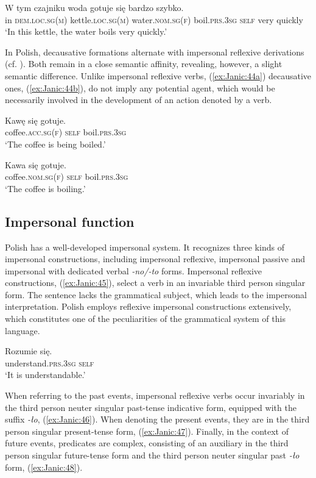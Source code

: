 \documentclass[output=paper]{langscibook}
\begin{document}
\ea \label{ex:Janic:43}
\gll W	tym		 czajniku	 woda	 gotuje	 się 	 bardzo	szybko.\\
 	in	\textsc{dem.loc.sg(m)}	kettle.\textsc{loc.sg(m)}	water.\textsc{nom.sg(f)}	boil.\textsc{prs.3sg}	\textsc{self}	very	quickly\\
\glt ‘In this kettle, the water boils very quickly.’	
\z 
	
In Polish, decausative formations alternate with impersonal reflexive derivations (cf. ). Both remain in a close semantic affinity, revealing, however, a slight semantic difference. Unlike impersonal reflexive verbs, (\ref{ex:Janic:44a}) decausative ones, (\ref{ex:Janic:44b}), do not imply any potential agent, which would be necessarily involved in the development of an action denoted by a verb.

\ea \label{ex:Janic:44}
\ea \label{ex:Janic:44a}
\gll Kawę				 się		 gotuje.\\
		coffee.\textsc{acc.sg(f)}	\textsc{self}	boil.\textsc{prs.3sg} \\	
\glt ‘The coffee is being boiled.’

\ex \label{ex:Janic:44b}
\gll Kawa		 się	 gotuje.\\
		coffee.\textsc{nom.sg(f)}		\textsc{self}	boil.\textsc{prs.3sg}\\
\glt ‘The coffee is boiling.' \citep[320]{Swan2002} 
\z 
\z 


\subsection{Impersonal function} \label{sec:Janic:4.2}

Polish has a well-developed impersonal system. It recognizes three kinds of impersonal constructions, including impersonal reflexive, impersonal passive and impersonal with dedicated verbal \textit{-no/-to} forms. Impersonal reflexive constructions, (\ref{ex:Janic:45}), select a verb in an invariable third person singular form. The sentence lacks the grammatical subject, which leads to the impersonal interpretation. Polish employs reflexive impersonal constructions extensively, which constitutes one of the peculiarities of the grammatical system of this language.

\ea \label{ex:Janic:45}
\gll Rozumie	 się.	\\
	 understand.\textsc{prs.3sg}	\textsc{self}\\
\glt ‘It is understandable.’	
\z 
	
When referring to the past events, impersonal reflexive verbs occur invariably in the third person neuter singular past-tense indicative form, equipped with the suffix \textit{-ło}, (\ref{ex:Janic:46}). When denoting the present events, they are in the third person singular present-tense form, (\ref{ex:Janic:47}). Finally, in the context of future events, predicates are complex, consisting of an auxiliary in the third person singular future-tense form and the third person neuter singular past \textit{-ło} form, (\ref{ex:Janic:48}).
\end{document}
